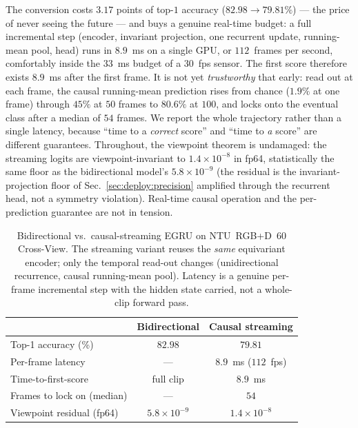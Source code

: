 \documentclass[10pt,journal]{IEEEtran}
\begin{document}
The conversion costs $3.17$ points of top-$1$ accuracy ($82.98\!\to\!79.81\%$) --- the price of
never seeing the future --- and buys a genuine real-time budget: a full incremental step (encoder,
invariant projection, one recurrent update, running-mean pool, head) runs in $8.9$~ms on a single
GPU, or $112$~frames per second, comfortably inside the $33$~ms budget of a $30$~fps sensor. The
first score therefore exists $8.9$~ms after the first frame. It is not yet \emph{trustworthy} that
early: read out at each frame, the causal running-mean prediction rises from chance ($1.9\%$ at one
frame) through $45\%$ at $50$ frames to $80.6\%$ at $100$, and locks onto the eventual class after a
median of $54$ frames. We report the whole trajectory rather than a single latency, because ``time
to a \emph{correct} score'' and ``time to \emph{a} score'' are different guarantees. Throughout, the
viewpoint theorem is undamaged: the streaming logits are viewpoint-invariant to $1.4\times10^{-8}$
in fp64, statistically the same floor as the bidirectional model's $5.8\times10^{-9}$ (the residual
is the invariant-projection floor of Sec.~\ref{sec:deploy:precision} amplified through the recurrent
head, not a symmetry violation). Real-time causal operation and the per-prediction guarantee are not
in tension.

\begin{table}[!t]
\centering
\caption{Bidirectional vs.\ causal-streaming EGRU on NTU~RGB+D~$60$ Cross-View. The streaming variant
reuses the \emph{same} equivariant encoder; only the temporal read-out changes (unidirectional
recurrence, causal running-mean pool). Latency is a genuine per-frame incremental step with the
hidden state carried, not a whole-clip forward pass.}
\label{tab:streaming}
\scriptsize
\setlength{\tabcolsep}{5pt}
\begin{tabular}{lcc}
\toprule
 & Bidirectional & Causal streaming \\
\midrule
Top-1 accuracy (\%)             & $82.98$        & $79.81$ \\
Per-frame latency               & ---            & $8.9$~ms ($112$~fps) \\
Time-to-first-score             & full clip      & $8.9$~ms \\
Frames to lock on (median)      & ---            & $54$ \\
Viewpoint residual (fp64)       & $5.8\times10^{-9}$ & $1.4\times10^{-8}$ \\
\bottomrule
\end{tabular}
\end{table}
\end{document}
